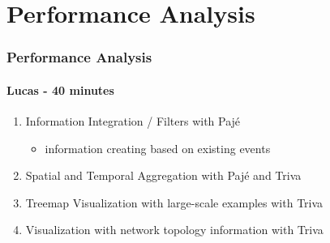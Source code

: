 \section{Performance Analysis}

\frame
{
  \frametitle{Performance Analysis}
  \framesubtitle{Lucas - 40 minutes}

  \begin{enumerate}
  \item Information Integration / Filters with Paj\'e
    \begin{itemize}
    \item information creating based on existing events
    \end{itemize}
  \item Spatial and Temporal Aggregation with Paj\'e and Triva
  \item Treemap Visualization with large-scale examples with Triva
  \item Visualization with network topology information with Triva
  \end{enumerate}
}







